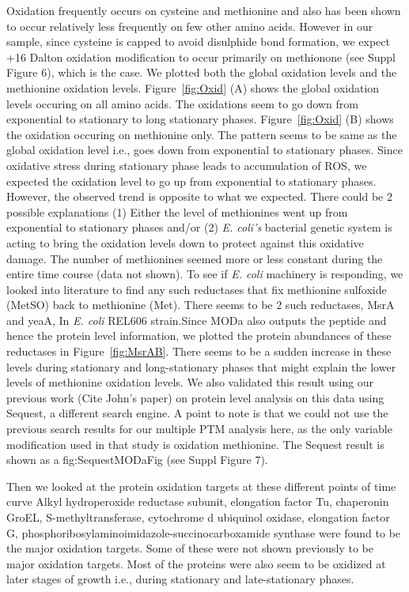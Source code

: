 \documentclass[12pt]{article}
\begin{document}
Oxidation frequently occurs on cysteine and methionine and also has been shown to occur relatively less frequently on few other amino acids. However in our sample, since cysteine is capped to avoid disulphide bond formation, we expect +16 Dalton oxidation modification to occur primarily on methionone (see Suppl Figure 6), which is the case. We plotted both the global oxidation levels and the methionine oxidation levels. Figure~\ref{fig:Oxid} (A) shows the global oxidation levels occuring on all amino acids. The oxidations seem to go down from exponential to stationary to long stationary phases. Figure~\ref{fig:Oxid} (B) shows the oxidation occuring on methionine only. The pattern seems to be same as the global oxidation level i.e., goes down from exponential to stationary phases. Since oxidative stress during stationary phase leads to accumulation of ROS, we expected the oxidation level to go up from exponential to stationary phases. However, the observed trend is opposite to what we expected. There could be 2 possible explanations (1) Either the level of methionines went up from exponential to stationary phases and/or (2) \emph{E. coli's} bacterial genetic system is acting to bring the oxidation levels down to protect against this oxidative damage. The number of methionines seemed more or less constant during the entire time course (data not shown). To see if \emph{E. coli} machinery is responding, we looked into literature to find any such reductases that fix methionine sulfoxide (MetSO) back to methionine (Met).  There seems to be 2 such reductases, MsrA and yeaA, In \emph{E. coli} REL606 strain.Since MODa also outputs the peptide and hence the protein level information, we plotted the protein abundances of these reductases in Figure~\ref{fig:MsrAB}. There seems to be a sudden increase in these levels during stationary and long-stationary phases that might explain the lower levels of methionine oxidation levels. We also validated this result using our previous work (Cite John's paper) on protein level analysis on this data using Sequest, a different search engine. A point to note is that we  could not use the previous search results for our multiple PTM analysis here, as the only variable modification used in that study is oxidation methionine. The Sequest result is shown as a fig:SequestMODaFig (see Suppl Figure 7).

Then we looked at the protein oxidation targets at these different points of time curve Alkyl hydroperoxide reductase subunit, elongation factor Tu, chaperonin GroEL, S-methyltransferase, cytochrome d ubiquinol oxidase, elongation factor G, phosphoribosylaminoimidazole-succinocarboxamide synthase were found to be the major oxidation targets. Some of these were not shown previously to be major oxidation targets. Most of the proteins were also seem to be oxidized at later stages of growth i.e., during stationary and late-stationary phases.
\end{document}
